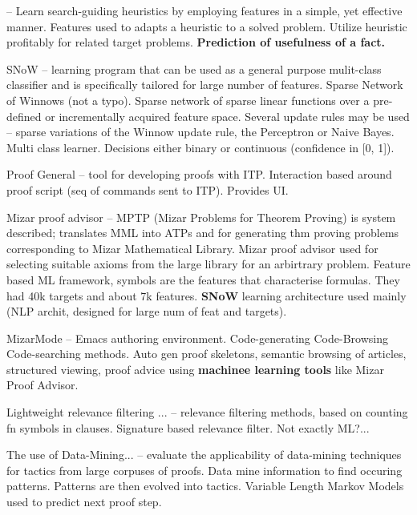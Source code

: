 \documentclass{article}
\begin{document}
\cite{FeatureBasedThmP} -- Learn search-guiding heuristics by employing
features in a simple, yet effective manner. Features used to adapts a heuristic
to a solved problem. Utilize heuristic profitably for related target problems.
\textbf{Prediction of usefulness of a fact.} 

SNoW \cite{SNoW} -- learning program that can be used as a general purpose
mulit-class classifier and is specifically tailored for large number of
features. Sparse Network of Winnows (not a typo). Sparse network of sparse
linear functions over a pre-defined or incrementally acquired feature space.
Several update rules may be used -- sparse variations of the Winnow update
rule, the Perceptron or Naive Bayes. Multi class learner. Decisions either
binary or continuous (confidence in [0, 1]).

Proof General \cite{ProofGeneral} -- tool for developing proofs with ITP.
Interaction based around proof script (seq of commands sent to ITP). Provides
UI.

Mizar proof advisor \cite{MizarProofAdvisor} -- MPTP (Mizar Problems for
Theorem Proving) is system described; translates MML into ATPs and for
generating thm proving problems corresponding to Mizar Mathematical Library.
Mizar proof advisor used for selecting suitable axioms from the large library
for an arbirtrary problem. Feature based ML framework, symbols are the features
that characterise formulas. They had 40k targets and about 7k features.
\textbf{SNoW} learning architecture used mainly (NLP archit, designed for large
num of feat and targets).

MizarMode \cite{MizarMode} -- Emacs authoring environment. Code-generating
Code-Browsing Code-searching methods. Auto gen proof skeletons, semantic
browsing of articles, structured viewing, proof advice using \textbf{machinee
learning tools} like Mizar Proof Advisor. 

Lightweight relevance filtering ... \cite{LightweightPaulson} -- relevance
filtering methods, based on counting fn symbols in clauses. Signature based
relevance filter. Not exactly ML?...

The use of Data-Mining... \cite{DataMiningAFT} -- evaluate the applicability of
data-mining techniques for tactics from large corpuses of proofs. Data mine
information to find occuring patterns. Patterns are then evolved into tactics.
Variable Length Markov Models used to predict next proof step.
\end{document}
